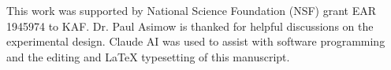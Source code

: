 \documentclass[gchron, manuscript]{copernicus}
\begin{document}





\begin{acknowledgements}
This work was supported by National Science Foundation (NSF) grant EAR 1945974 to KAF. Dr. Paul Asimow is thanked for helpful discussions on the experimental design. Claude AI was used to assist with software programming and the editing and LaTeX typesetting of this manuscript.
\end{acknowledgements}
\end{document}

